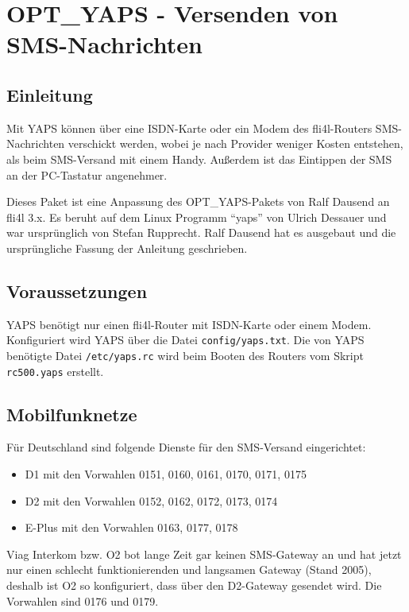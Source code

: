 \section {OPT\_YAPS - Versenden von SMS-Nachrichten}

\subsection {Einleitung}

Mit YAPS können über eine ISDN-Karte oder ein Modem des fli4l-Routers
SMS-Nachrichten verschickt werden, wobei je nach Provider weniger Kosten
entstehen, als beim SMS-Versand mit einem Handy. Außerdem ist das Eintippen
der SMS an der PC-Tastatur angenehmer.

Dieses Paket ist eine Anpassung des OPT\_YAPS-Pakets von Ralf Dausend
an fli4l 3.x. Es beruht auf dem Linux Programm ``yaps'' von Ulrich Dessauer
und war ursprünglich von Stefan Rupprecht. Ralf Dausend hat es ausgebaut und
die ursprüngliche Fassung der Anleitung geschrieben.

\subsection {Voraussetzungen}

YAPS benötigt nur einen fli4l-Router mit ISDN-Karte oder einem Modem.
Konfiguriert wird YAPS über die Datei \texttt{config/yaps.txt}. Die von YAPS
benötigte Datei \texttt{/etc/yaps.rc} wird beim Booten des Routers vom Skript
\texttt{rc500.yaps} erstellt.


\subsection {Mobilfunknetze}

Für Deutschland sind folgende Dienste für den SMS-Versand eingerichtet:
\begin{itemize}
\item D1 mit den Vorwahlen 0151, 0160, 0161, 0170, 0171, 0175
\item D2 mit den Vorwahlen 0152, 0162, 0172, 0173, 0174
\item E-Plus mit den Vorwahlen 0163, 0177, 0178
\end{itemize}

Viag Interkom bzw. O2 bot lange Zeit gar keinen SMS-Gateway an und hat jetzt
nur einen schlecht funktionierenden und langsamen Gateway (Stand 2005), deshalb
ist O2 so konfiguriert, dass über den D2-Gateway gesendet wird. Die Vorwahlen
sind 0176 und 0179.

